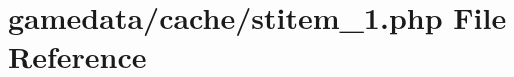 \hypertarget{stitem__1_8php}{\section{gamedata/cache/stitem\+\_\+1.php File Reference}
\label{stitem__1_8php}
}
